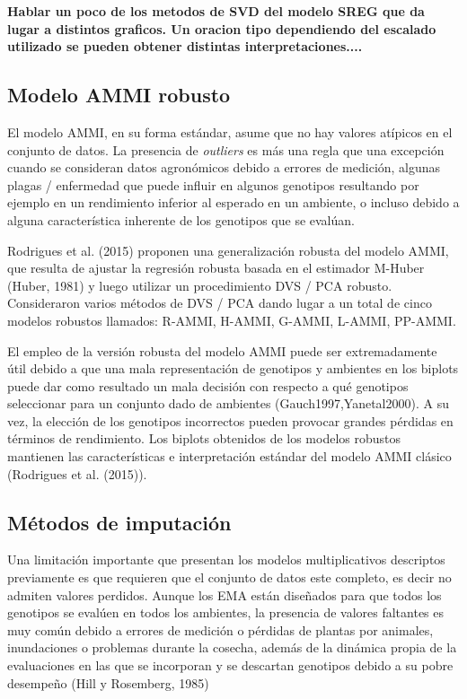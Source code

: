 \textbf{Hablar un poco de los metodos de SVD del modelo SREG que da lugar a distintos graficos. Un oracion tipo dependiendo del escalado utilizado se pueden obtener distintas interpretaciones....}

\subsection{Modelo AMMI robusto}

El modelo AMMI, en su forma estándar, asume que no hay valores atípicos en el conjunto de datos. La presencia de \emph{outliers} es más una regla que una excepción cuando se consideran datos agronómicos debido a errores de medición, algunas plagas / enfermedad que puede influir en algunos genotipos  resultando por ejemplo en un rendimiento inferior al esperado en un ambiente, o incluso debido a alguna característica inherente de los genotipos que se evalúan.

Rodrigues et al. (2015) proponen una generalización robusta del modelo AMMI, que resulta de ajustar la regresión robusta basada en el estimador M-Huber (Huber, 1981) y luego utilizar un procedimiento DVS / PCA robusto. Consideraron varios métodos de DVS / PCA dando lugar a un total de cinco modelos robustos llamados: R-AMMI, H-AMMI, G-AMMI, L-AMMI, PP-AMMI. 

El empleo de la versión robusta del modelo AMMI puede ser extremadamente útil debido a que una mala representación de genotipos y ambientes en los biplots puede dar como resultado un mala decisión con respecto a qué genotipos seleccionar para un conjunto dado de ambientes (Gauch1997,Yanetal2000). A su vez, la elección de los genotipos incorrectos pueden provocar grandes pérdidas en términos de rendimiento. Los biplots obtenidos de los modelos robustos mantienen las características e interpretación estándar del modelo AMMI clásico (Rodrigues et al. (2015)).


\subsection{Métodos de imputación}


Una limitación importante que presentan los modelos multiplicativos descriptos previamente es que requieren que el conjunto de datos este completo, es decir no admiten valores perdidos. Aunque los EMA están diseñados para que todos los genotipos se evalúen en todos los ambientes, la presencia de valores faltantes es muy común debido a errores de medición o pérdidas de plantas por animales, inundaciones o problemas durante la cosecha, además de la dinámica propia de la evaluaciones en las que se incorporan y se descartan genotipos debido a su pobre desempeño (Hill y Rosemberg, 1985)

